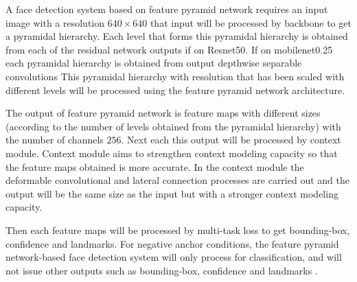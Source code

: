 A face detection system based on feature pyramid network requires an input image with a resolution
$640\times640$ that input will be processed by backbone to get a pyramidal hierarchy.
Each level that forms this pyramidal hierarchy is obtained from each of the residual network outputs
if on Resnet50. If on mobilenet0.25 each pyramidal hierarchy is obtained from output depthwise separable convolutions
This pyramidal hierarchy with resolution that has been scaled with different levels
will be processed using the feature pyramid network architecture.

The output of feature pyramid network is feature maps with different sizes
(according to the number of levels obtained from the pyramidal hierarchy) with the number of channels $256$. Next each
this output will be processed by context module. Context module aims to strengthen context modeling capacity
so that the feature maps obtained is more accurate. In the context module the deformable convolutional and lateral connection processes are carried out
and the output will be the same size as the input but with a stronger context modeling capacity.

Then each feature maps will be processed by multi-task loss to get bounding-box, confidence and landmarks.
For negative anchor conditions, the feature pyramid network-based face detection system will only process for classification, and will not issue
other outputs such as bounding-box, confidence and landmarks \citep{deng2019retinaface}.
